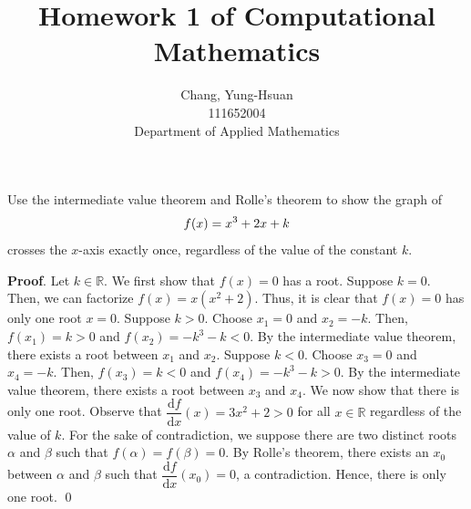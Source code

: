 \documentclass[11pt]{article}
\title{Homework 1 of Computational Mathematics}
\author{Chang, Yung-Hsuan\\111652004\\Department of Applied Mathematics}
\theoremstyle{break}
\newcommand{\dd}{\text{d}}
\numberwithin{equation}{theorem}
\begin{document}
\maketitle
\thispagestyle{empty}
\newpage
{}

\begin{problem}\label{problem 1}
    Use the intermediate value theorem and Rolle's theorem to show the graph of \vspace{-0.6em}
    \begin{equation*}
        f(x)=x^3+2x+k \vspace{-0.6em}
    \end{equation*}
    crosses the $x$-axis exactly once, regardless of the value of the constant $k$.
\end{problem}
\textbf{Proof}. Let $k\in\mathbb R$. We first show that $f(x)=0$ has a root. Suppose $k=0$. Then, we can factorize $f(x)=x(x^2+2)$. Thus, it is clear that $f(x)=0$ has only one root $x=0$. Suppose $k>0$. Choose $x_1=0$ and $x_2=-k$. Then, $f(x_1)=k>0$ and $f(x_2)=-k^3-k<0$. By the intermediate value theorem, there exists a root between $x_1$ and $x_2$. Suppose $k<0$. Choose $x_3=0$ and $x_4=-k$. Then, $f(x_3)=k<0$ and $f(x_4)=-k^3-k>0$. By the intermediate value theorem, there exists a root between $x_3$ and $x_4$. We now show that there is only one root. Observe that $\dfrac{\dd f}{\dd x}(x)=3x^2+2>0$ for all $x\in\mathbb R$ regardless of the value of $k$. For the sake of contradiction, we suppose there are two distinct roots $\alpha$ and $\beta$ such that $f(\alpha)=f(\beta)=0$. By Rolle's theorem, there exists an $x_0$ between $\alpha$ and $\beta$ such that $\dfrac{\dd f}{\dd x}(x_0)=0$, a contradiction. Hence, there is only one root. \qed
\end{document}
